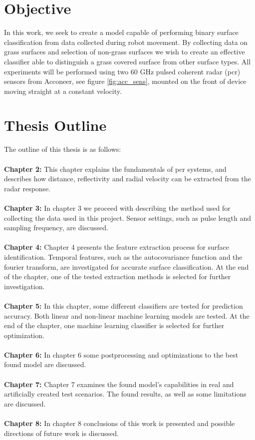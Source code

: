 \section{Objective}

In this work, we seek to create a model capable of performing binary surface classification from data collected during robot movement. By collecting data on grass surfaces and selection of non-grass surfaces we wish to create an effective classifier able to distinguish a grass covered surface from other surface types. All experiments will be performed using two 60 GHz pulsed coherent radar (\gls{pcr}) sensors from Acconeer, see figure \ref{fig:acc_sens},  mounted on the front of device moving straight at a constant velocity. 

\section{Thesis Outline}

The outline of this thesis is as follows:
\\ \\
\noindent\textbf{Chapter 2:} This chapter explains the fundamentals of \gls{pcr} systems, and describes how distance, reflectivity and radial velocity can be extracted from the radar response. 
\\ \\
\noindent\textbf{Chapter 3:} In chapter 3 we proceed with describing the method used for collecting the data used in this project. Sensor settings, such as pulse length and sampling frequency, are discussed. 
\\ \\
\noindent\textbf{Chapter 4:} Chapter 4 presents the feature extraction process for surface identification. Temporal features, such as the autocovariance function and the fourier transform, are investigated for accurate surface classification. At the end of the chapter, one of the tested extraction methods is selected for further investigation. 
\\ \\
\noindent\textbf{Chapter 5:}  In this chapter, some different classifiers are tested for prediction accuracy. Both linear and non-linear machine learning models are tested. At the end of the chapter, one machine learning classifier is selected for further optimization. 
\\ \\
\noindent\textbf{Chapter 6:} In chapter 6 some postprocessing and optimizations to the best found model are discussed. 
\\ \\
\noindent\textbf{Chapter 7:} Chapter 7 examines the found model's capabilities in real and artificially created test scenarios. The found results, as well as some limitations are discussed.
\\ \\
\noindent\textbf{Chapter 8:} In chapter 8 conclusions of this work is presented and possible directions of future work is discussed. 







